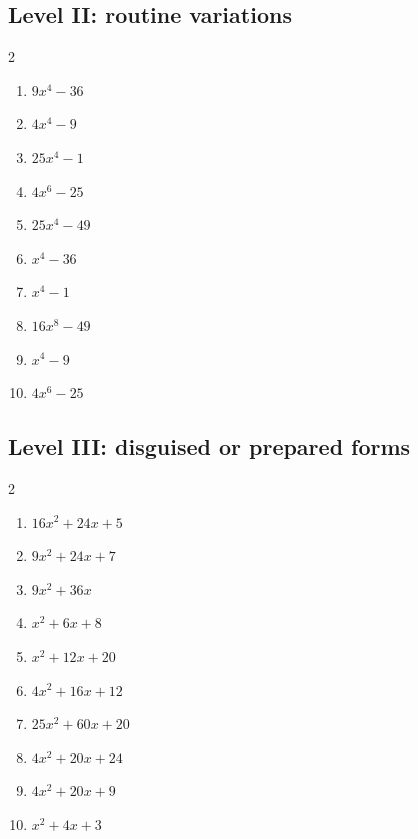 \documentclass[11pt,oneside]{book}
\begin{document}
\subsection*{Level II: routine variations}
\begin{multicols}{2}
\begin{enumerate}[leftmargin=*,label=\textbf{\arabic*.},itemsep=0.65\baselineskip]
\item $ 9 x^{4} - 36 $
\item $ 4 x^{4} - 9 $
\item $ 25 x^{4} - 1 $
\item $ 4 x^{6} - 25 $
\item $ 25 x^{4} - 49 $
\item $ x^{4} - 36 $
\item $ x^{4} - 1 $
\item $ 16 x^{8} - 49 $
\item $ x^{4} - 9 $
\item $ 4 x^{6} - 25 $
\end{enumerate}
\end{multicols}
\subsection*{Level III: disguised or prepared forms}
\begin{multicols}{2}
\begin{enumerate}[leftmargin=*,label=\textbf{\arabic*.},itemsep=0.65\baselineskip]
\item $ 16 x^{2} + 24 x + 5 $
\item $ 9 x^{2} + 24 x + 7 $
\item $ 9 x^{2} + 36 x $
\item $ x^{2} + 6 x + 8 $
\item $ x^{2} + 12 x + 20 $
\item $ 4 x^{2} + 16 x + 12 $
\item $ 25 x^{2} + 60 x + 20 $
\item $ 4 x^{2} + 20 x + 24 $
\item $ 4 x^{2} + 20 x + 9 $
\item $ x^{2} + 4 x + 3 $
\end{enumerate}
\end{multicols}
\end{document}
